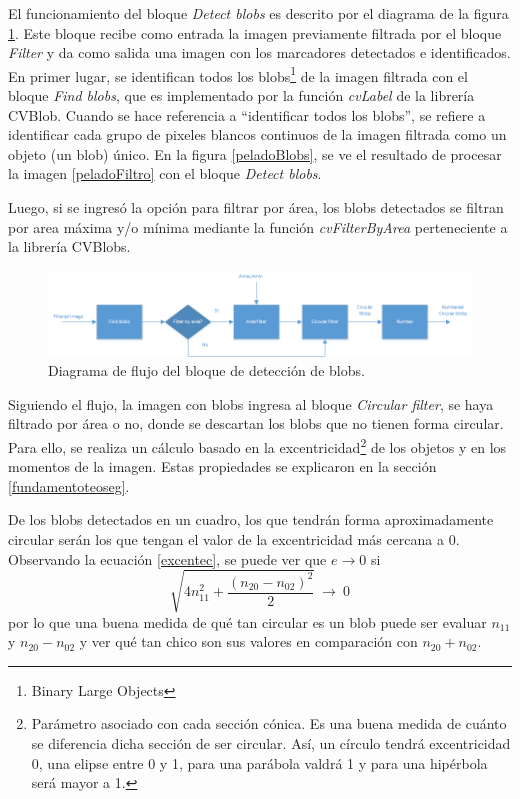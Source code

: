El funcionamiento del bloque \emph{Detect blobs} es descrito por el diagrama de la figura \ref{diagramadetectblobs}. Este bloque recibe como entrada la imagen previamente filtrada por el bloque \emph{Filter} y da como salida una imagen con los marcadores detectados e identificados. En primer lugar, se identifican todos los blobs\footnote{Binary Large Objects\cite{defBlob}} de la imagen filtrada con el bloque \emph{Find blobs}, que es implementado por la función \emph{cvLabel} de la librería CVBlob\cite{cvblob}. Cuando se hace referencia a ``identificar todos los blobs'', se refiere a identificar cada grupo de pixeles blancos continuos de la imagen filtrada como un objeto (un blob) único. En la figura \ref{peladoBlobs}, se ve el resultado de procesar la imagen \ref{peladoFiltro} con el bloque \emph{Detect blobs}. 

Luego, si se ingresó la opción para filtrar por área, los blobs\cite{defBlob} detectados se filtran por area máxima y/o mínima mediante la función \emph{cvFilterByArea} perteneciente a la librería CVBlobs\cite{cvblob}. 

\begin{figure}[H]
\begin{center}
\includegraphics[scale=0.7]{img/detectBlobs_diagrama.png}
\end{center}
\caption{Diagrama de flujo del bloque de detección de blobs.}
\label{diagramadetectblobs}
\end{figure}

Siguiendo el flujo, la imagen con blobs ingresa al bloque \emph{Circular filter}, se haya filtrado por área o no, donde se descartan los blobs que no tienen forma circular. Para ello, se realiza un cálculo basado en la excentricidad\footnote{Parámetro asociado con cada sección cónica. Es una buena medida de cuánto se diferencia dicha sección de ser circular. Así, un círculo tendrá excentricidad 0, una elipse entre 0 y 1, para una parábola valdrá 1 y para una hipérbola será mayor a 1\cite{excentricidad}. } de los objetos y en los momentos de la imagen. Estas propiedades se explicaron en la sección \ref{fundamentoteoseg}.

De los blobs detectados en un cuadro, los que tendrán forma aproximadamente circular serán los que tengan el valor de la excentricidad más cercana a $0$. Observando la ecuación \ref{excentec}, se puede ver que $e{\rightarrow}0$ si $$\sqrt{4n_{11}^2+\frac{(n_{20}-n_{02})^2}{2}}\ {\rightarrow}\ 0$$ por lo que una buena medida de qué tan circular es un blob puede ser evaluar $n_{11}$ y $n_{20}-n_{02}$ y ver qué tan chico son sus valores en comparación con $n_{20}+n_{02}$.

